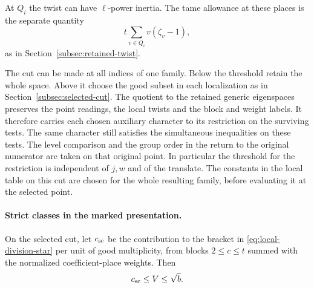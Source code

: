 At \(Q_i\) the twist can have \(\ell\)-power inertia. The tame allowance at these places is the separate quantity
\[
 t\sum_{v\in Q_i}v(\zeta_v-1),
\]
as in Section~\ref{subsec:retained-twist}.
\cite{milne-duality}\label{cor:division-length-2}

The cut can be made at all indices of one family. Below the
threshold retain the whole space. Above it choose the good
subset in each localization as in Section~\ref{subsec:selected-cut}.
The quotient to the retained generic eigenspaces preserves the
point readings, the local twists and the block and weight labels.
It therefore carries each chosen auxiliary character to its
restriction on the surviving tests. The same character still
satisfies the simultaneous inequalities on these tests. The
level comparison and the group order in the return to the
original numerator are taken on that original point. In particular
the threshold for the restriction is independent of \(j,w\)
and of the translate. The constants in the local table on this
cut are chosen for the whole resulting family, before evaluating
it at the selected point. \label{cor:division-length-3}

\paragraph{Strict classes in the marked presentation.}
\begin{lemma}\label{lem:scalar-strict-cost}
On the selected cut, let \(c_{\rm sc}\) be the contribution to the bracket in \eqref{eq:local-division-star} per unit of good multiplicity, from blocks \(2\le c\le t\) summed with the normalized coefficient-place weights. Then
\[
 c_{\rm sc}\le V\le\sqrt b.
\]
\end{lemma}

